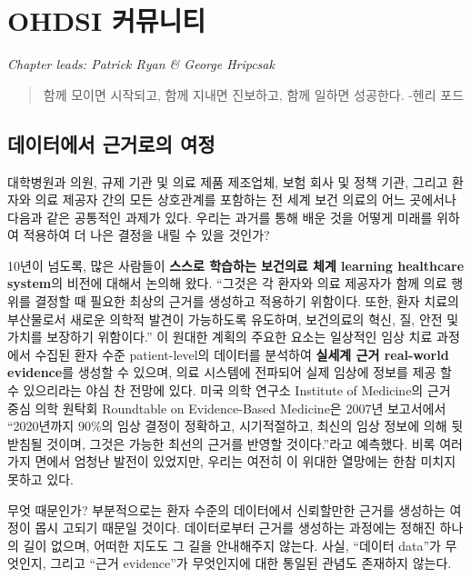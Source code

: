 \documentclass[10.5pt]{book}
\theoremstyle{definition}
\theoremstyle{definition}
\theoremstyle{definition}
\theoremstyle{remark}
\begin{document}
\chapter{OHDSI 커뮤니티}\label{OhdsiCommunity}

\emph{Chapter leads: Patrick Ryan \& George Hripcsak}

\begin{quote}
함께 모이면 시작되고, 함께 지내면 진보하고, 함께 일하면 성공한다. -헨리
포드
\end{quote}

\section{데이터에서 근거로의 여정}\label{--}

대학병원과 의원, 규제 기관 및 의료 제품 제조업체, 보험 회사 및 정책
기관, 그리고 환자와 의료 제공자 간의 모든 상호관계를 포함하는 전 세계
보건 의료의 어느 곳에서나 다음과 같은 공통적인 과제가 있다. 우리는
과거를 통해 배운 것을 어떻게 미래를 위하여 적용하여 더 나은 결정을 내릴
수 있을 것인가?

10년이 넘도록, 많은 사람들이 \textbf{스스로 학습하는 보건의료 체계
learning healthcare system}의 비전에 대해서 논의해 왔다. ``그것은 각
환자와 의료 제공자가 함께 의료 행위를 결정할 때 필요한 최상의 근거를
생성하고 적용하기 위함이다. 또한, 환자 치료의 부산물로서 새로운 의학적
발견이 가능하도록 유도하며, 보건의료의 혁신, 질, 안전 및 가치를 보장하기
위함이다.'' \citep{olsen2007learning} 이 원대한 계획의 주요한 요소는
일상적인 임상 치료 과정에서 수집된 환자 수준 patient-level의 데이터를
분석하여 \textbf{실세계 근거 real-world evidence}를 생성할 수 있으며,
의료 시스템에 전파되어 실제 임상에 정보를 제공 할 수 있으리라는 야심 찬
전망에 있다. 미국 의학 연구소 Institute of Medicine의 근거 중심 의학
원탁회 Roundtable on Evidence-Based Medicine은 2007년 보고서에서
``2020년까지 90\%의 임상 결정이 정확하고, 시기적절하고, 최신의 임상
정보에 의해 뒷받침될 것이며, 그것은 가능한 최선의 근거를 반영할
것이다.''라고 예측했다. \citep{olsen2007learning} 비록 여러 가지 면에서
엄청난 발전이 있었지만, 우리는 여전히 이 위대한 열망에는 한참 미치지
못하고 있다.

무엇 때문인가? 부분적으로는 환자 수준의 데이터에서 신뢰할만한 근거를
생성하는 여정이 몹시 고되기 때문일 것이다. 데이터로부터 근거를 생성하는
과정에는 정해진 하나의 길이 없으며, 어떠한 지도도 그 길을 안내해주지
않는다. 사실, ``데이터 data''가 무엇인지, 그리고 ``근거 evidence''가
무엇인지에 대한 통일된 관념도 존재하지 않는다.
\end{document}

